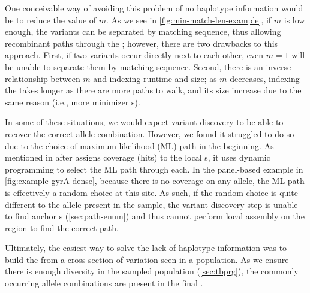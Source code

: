 One conceivable way of avoiding this problem of no haplotype information would be to reduce the value of $m$. As we see in \autoref{fig:min-match-len-example}, if $m$ is low enough, the variants can be separated by matching sequence, thus allowing recombinant paths through the \prg{}; however, there are two drawbacks to this approach. First, if two variants occur directly next to each other, even $m=1$ will be unable to separate them by matching sequence. Second, there is an inverse relationship between $m$ and indexing runtime and size; as $m$ decreases, indexing the \prg{} takes longer as there are more paths to walk, and its size increase due to the same reason (i.e., more minimizer \kmer{}s).

In some of these situations, we would expect \denovo{} variant discovery to be able to recover the correct allele combination. However, we found it struggled to do so due to the choice of maximum likelihood (ML) path in the beginning. As mentioned in  after \pandora{} assigns \kmer{} coverage (hits) to the local \prg{}s, it uses dynamic programming to select the ML path through each. In the panel-based \prg{} example in \autoref{fig:example-gyrA-dense}, because there is no coverage on any allele, the ML path is effectively a random choice at this site. As such, if the random choice is quite different to the allele present in the sample, the \denovo{} variant discovery step is unable to find anchor \kmer{}s (\autoref{sec:path-enum}) and thus cannot perform local assembly on the region to find the correct path.

Ultimately, the easiest way to solve the lack of haplotype information was to build the \prg{} from a cross-section of variation seen in a population. As we ensure there is enough diversity in the sampled population (\autoref{sec:tbprg}), the commonly occurring allele combinations are present in the final \prg{}.


